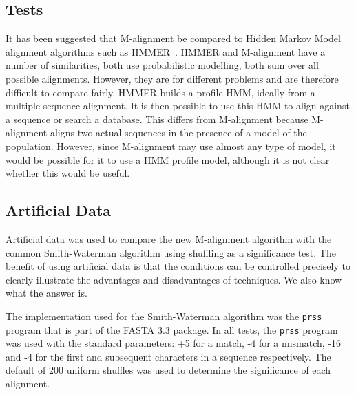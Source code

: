 \documentclass[letterpaper,11pt,oneside]{article}
\begin{document}
\begin{multicols}{2}

 





\section{Tests}

It has been suggested that M-alignment be compared to Hidden Markov Model
alignment algorithms such as HMMER~\cite{eddy98}.  HMMER and M-alignment have
a number of similarities, both use probabilistic modelling, both sum over all
possible alignments.  However, they are for different problems and are
therefore difficult to compare fairly.  HMMER builds a profile HMM, ideally
from a multiple sequence alignment.  It is then possible to use this HMM to
align against a sequence or search a database.  This differs from M-alignment
because M-alignment aligns two actual sequences in the presence of a
model of the population.  However, since M-alignment may use almost any type
of model, it would be possible for it to use a HMM profile model, although it
is not clear whether this would be useful.


\subsection{Artificial Data}

Artificial data was used to compare the new M-alignment algorithm with the
common Smith-Waterman algorithm using shuffling as a significance test.  The
benefit of using artificial data is that the conditions can be controlled
precisely to clearly illustrate the advantages and disadvantages of
techniques.
We also know what the answer is.

The implementation used for the Smith-Waterman algorithm was the \verb!prss!
program that is part of the FASTA 3.3 package.  In all tests, the \verb!prss!
program was used with the standard parameters: +5 for a match, -4 for a
mismatch, -16 and -4 for the first and subsequent characters in a sequence
respectively.  The default of 200 uniform shuffles was used to determine the
significance of each alignment.


\end{multicols}
\end{document}
